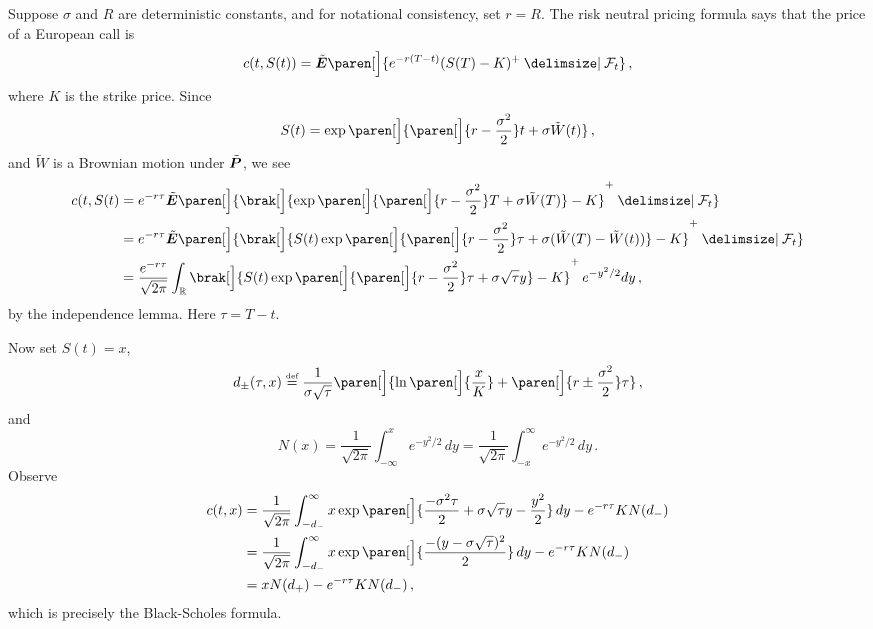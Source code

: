 Suppose $\sigma$ and $R$ are deterministic constants, and for notational consistency, set $r = R$.
The risk neutral pricing formula says that the price of a European call is
\begin{equation*}
  c(t, S(t)) = \tilde\E\paren[\Big]{
    e^{-r(T-t)}	(S(T) - K)^+ \given \mathcal F_t
  }\,,
\end{equation*}
where $K$ is the strike price.
Since
\begin{equation*}
  S(t) = \exp\paren[\Big]{ \paren[\Big]{ r - \frac{\sigma^2}{2}} t + \sigma \tilde W(t) }\,,
\end{equation*}
and $\tilde W$ is a Brownian motion under $\tilde\P$, we see
\begin{align*}
  c(t, S(t)
    &= e^{-r\tau} \tilde\E\paren[\Big]{\brak[\Big]{
	\exp\paren[\Big]{ \paren[\Big]{ r - \frac{\sigma^2}{2} } T + \sigma \tilde W(T)} -K }^+
      \given \mathcal F_t }
  \\
    &= e^{-r\tau} \tilde\E\paren[\Big]{
      \brak[\Big]{S(t) \exp\paren[\Big]{ \paren[\Big]{r - \frac{\sigma^2}{2}} \tau + \sigma (\tilde W(T) - \tilde W(t))} - K }^+ \given \mathcal F_t }
  \\
    &= \frac{e^{-r \tau}}{\sqrt{2\pi}}
	\int_\R 
	  \brak[\Big]{S(t) \exp\paren[\Big]{ \paren[\Big]{r - \frac{\sigma^2}{2}} \tau + \sigma \sqrt{\tau} y} - K }^+ \, e^{-y^2 / 2} dy\,,
\end{align*}
by the independence lemma.
Here $\tau = T - t$.

Now set $S(t) = x$,
\begin{equation*}
  d_\pm( \tau, x ) \defeq
  \frac{1}{\sigma \sqrt{\tau}}\paren[\Big]{
    \ln\paren[\Big]{\frac{x}{K}}
    + \paren[\Big]{ r \pm \frac{\sigma^2}{2} } \tau
  }\,,
\end{equation*}
and
\begin{equation*}
  N(x)
    = \frac{1}{\sqrt{2\pi}} \int_{-\infty}^x e^{-y^2/2} \, dy
    = \frac{1}{\sqrt{2\pi}} \int_{-x}^\infty e^{-y^2/2} \, dy\,.
\end{equation*}
Observe
\begin{align*}
  c(t, x)
    &= \frac{1}{\sqrt{2\pi}} \int_{-d_-}^\infty 
	x \exp\paren[\Big]{ \frac{-\sigma^2 \tau}{2} + \sigma\sqrt{\tau} y - \frac{y^2}{2} } \, dy
	- e^{-r\tau} K N(d_-)
  \\
    &= \frac{1}{\sqrt{2\pi}} \int_{-d_-}^\infty 
	x \exp\paren[\Big]{ \frac{-(y - \sigma \sqrt{\tau})^2}{2}} \, dy
	- e^{-r\tau} K N(d_-)
  \\
    &= x N(d_+) 
	- e^{-r\tau} K N(d_-)\,,
\end{align*}
which is precisely the Black-Scholes formula.

